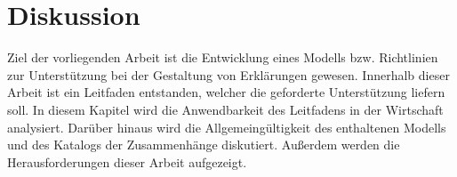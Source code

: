 \chapter{Diskussion}

Ziel der vorliegenden Arbeit ist die Entwicklung eines Modells bzw. Richtlinien zur Unterstützung bei der Gestaltung von Erklärungen gewesen. Innerhalb dieser Arbeit ist ein Leitfaden entstanden, welcher die geforderte Unterstützung liefern soll. In diesem Kapitel wird die Anwendbarkeit des Leitfadens in der Wirtschaft analysiert. Darüber hinaus wird die Allgemeingültigkeit des enthaltenen Modells und des Katalogs der Zusammenhänge diskutiert. Außerdem werden die Herausforderungen dieser Arbeit aufgezeigt.





